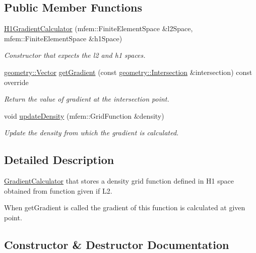 \subsection*{Public Member Functions}
\begin{DoxyCompactItemize}
\item 
\hyperlink{classraytracer_1_1physics_1_1H1GradientCalculator_aca95673d4009a25c00eafb913bdb807e}{H1\+Gradient\+Calculator} (mfem\+::\+Finite\+Element\+Space \&l2\+Space, mfem\+::\+Finite\+Element\+Space \&h1\+Space)
\begin{DoxyCompactList}\small\item\em Constructor that expects the l2 and h1 spaces. \end{DoxyCompactList}\item 
\hyperlink{classraytracer_1_1geometry_1_1Vector}{geometry\+::\+Vector} \hyperlink{classraytracer_1_1physics_1_1H1GradientCalculator_ad1a1647e254efdafb87421d007ca6eb1}{get\+Gradient} (const \hyperlink{structraytracer_1_1geometry_1_1Intersection}{geometry\+::\+Intersection} \&intersection) const override
\begin{DoxyCompactList}\small\item\em Return the value of gradient at the intersection point. \end{DoxyCompactList}\item 
void \hyperlink{classraytracer_1_1physics_1_1H1GradientCalculator_a4959559de8b7285f7d6a2c03e5467a35}{update\+Density} (mfem\+::\+Grid\+Function \&density)
\begin{DoxyCompactList}\small\item\em Update the density from which the gradient is calculated. \end{DoxyCompactList}\end{DoxyCompactItemize}


\subsection{Detailed Description}
\hyperlink{classraytracer_1_1physics_1_1GradientCalculator}{Gradient\+Calculator} that stores a density grid function defined in H1 space obtained from function given if L2. 

When get\+Gradient is called the gradient of this function is calculated at given point. 

\subsection{Constructor \& Destructor Documentation}
\mbox{\label{classraytracer_1_1physics_1_1H1GradientCalculator_aca95673d4009a25c00eafb913bdb807e}} 
